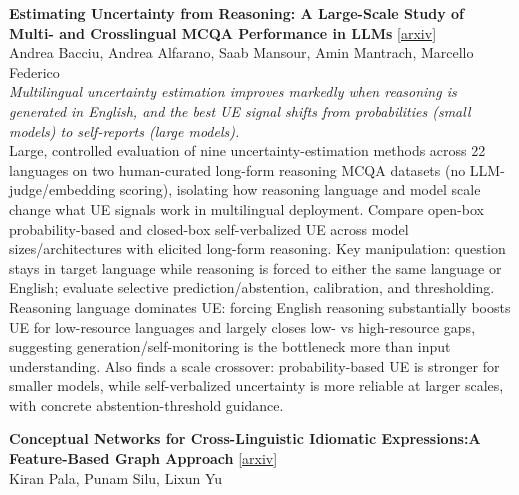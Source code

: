 \documentclass[12pt,letterpaper]{article}
\begin{document}
\medskip

{\small\textbf{Estimating Uncertainty from Reasoning: A Large-Scale Study of Multi- and Crosslingual MCQA Performance in LLMs}} {\scriptsize[\href{https://arxiv.org/abs/2607.06327}{arxiv}]}\\
{\scriptsize Andrea Bacciu, Andrea Alfarano, Saab Mansour, Amin Mantrach, Marcello Federico}\\

{\small\textit{Multilingual uncertainty estimation improves markedly when reasoning is generated in English, and the best UE signal shifts from probabilities (small models) to self-reports (large models).}}\\[1pt]
{\footnotesize Large, controlled evaluation of nine uncertainty-estimation methods across 22 languages on two human-curated long-form reasoning MCQA datasets (no LLM-judge/embedding scoring), isolating how reasoning language and model scale change what UE signals work in multilingual deployment. Compare open-box probability-based and closed-box self-verbalized UE across model sizes/architectures with elicited long-form reasoning. Key manipulation: question stays in target language while reasoning is forced to either the same language or English; evaluate selective prediction/abstention, calibration, and thresholding. Reasoning language dominates UE: forcing English reasoning substantially boosts UE for low-resource languages and largely closes low- vs high-resource gaps, suggesting generation/self-monitoring is the bottleneck more than input understanding. Also finds a scale crossover: probability-based UE is stronger for smaller models, while self-verbalized uncertainty is more reliable at larger scales, with concrete abstention-threshold guidance.}

\medskip

{\small\textbf{Conceptual Networks for Cross-Linguistic Idiomatic Expressions:A Feature-Based Graph Approach}} {\scriptsize[\href{https://arxiv.org/abs/2607.09576}{arxiv}]}\\
{\scriptsize Kiran Pala, Punam Silu, Lixun Yu}\\
\end{document}
